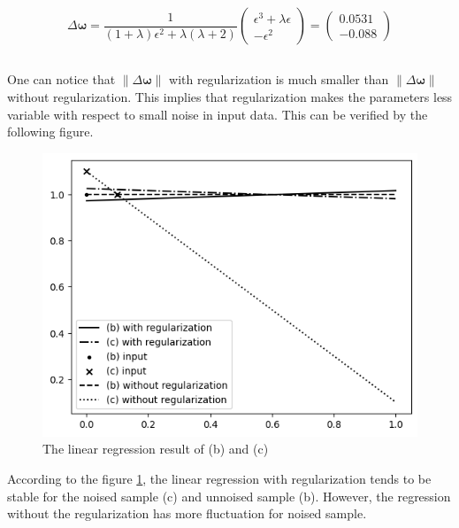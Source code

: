 \documentclass[12pt]{article}
\begin{document}
\begin{equation}
    \Delta \boldsymbol{\omega} = \frac{1}{(1+\lambda)\epsilon^2 + \lambda(\lambda + 2)} \begin{pmatrix}
        \epsilon^3 + \lambda\epsilon \\ -\epsilon^2
    \end{pmatrix} = \begin{pmatrix}
        0.0531 \\ -0.088
    \end{pmatrix}
\end{equation}

\subsection{}
One can notice that $\lVert\Delta \boldsymbol{\omega}\rVert$ with regularization is much smaller than $\lVert\Delta \boldsymbol{\omega}\rVert$ without regularization. This implies that regularization makes the parameters less variable with respect to small noise in input data. This can be verified by the following figure.

\begin{figure}[!h]
    \centering
    \includegraphics[scale = 0.5]{./figures/output2.png}
    \caption{The linear regression result of (b) and (c)}
    \label{fig:regularization}
\end{figure}

According to the figure \ref{fig:regularization}, the linear regression with regularization tends to be stable for the noised sample (c) and unnoised sample (b). However, the regression without the regularization has more fluctuation for noised sample. 
\end{document}
